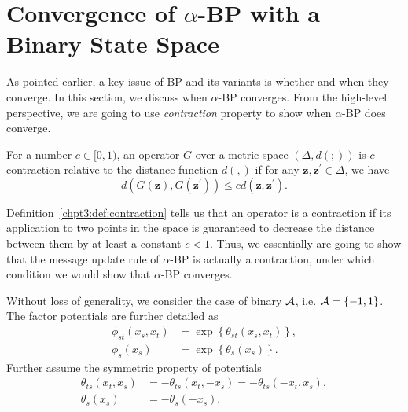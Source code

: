 


\section{Convergence of $\alpha$-BP with a Binary State Space}\label{chpt3:sec:cnvg-thm}

As pointed earlier, a key issue of BP and its variants is whether and when they converge. In this section, we discuss when $\alpha$-BP converges. 
From the high-level perspective, we are going to use \textit{contraction} property to show when $\alpha$-BP does converge.
\begin{definition}\label{chpt3:def:contraction}
  For a number $c \in [0,1)$, an operator $G$ over a metric space $(\Delta, d(;))$ is $c$-contraction relative to the distance function $d(,)$ if for any $\bm{z}, \bm{z}^{\prime} \in \Delta$, we have
  \begin{equation}
    d(G(\bm{z}), G(\bm{z}^{\prime})) \leq c d(\bm{z}, \bm{z}^{\prime}).
  \end{equation}
\end{definition}
Definition~\ref{chpt3:def:contraction} tells us that an operator is a contraction if its application to two points in the space is guaranteed to decrease the distance between them by at least a constant $c < 1$. Thus, we essentially are going to show that the message update rule of $\alpha$-BP is actually a contraction, under which condition we would show that $\alpha$-BP converges.


Without loss of generality, we consider the case of binary $\mathcal{A}$, i.e. $\mathcal{A}=\left\{ -1, 1 \right\}$. The factor potentials are further detailed as
\begin{align}
  \phi_{st}(x_s, x_t) &= \exp\left\{ \theta_{st}(x_s, x_t)\right\}, \nonumber \\
  \phi_{s}(x_s) &= \exp\left\{ \theta_{s}(x_s) \right\}.
\end{align}
Further assume the symmetric property of potentials
\begin{align}
  \theta_{ts}(x_t, x_s) &= -\theta_{ts}(x_t, -x_s) = -\theta_{ts}(-x_t, x_s), \nonumber\\
  \theta_{s}(x_s) &= - \theta_s(-x_s).
\end{align}

